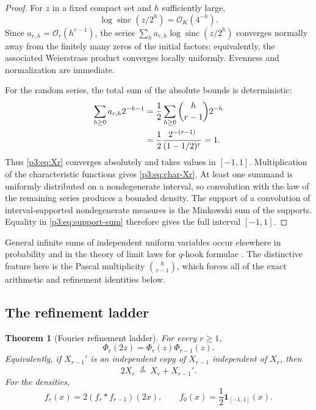 \documentclass[11pt,oneside]{article}
\newtheorem{theorem}{Theorem}[section]
\theoremstyle{definition}
\theoremstyle{remark}
\newcommand{\sinc}{\operatorname{sinc}}
\newcommand{\bigO}{\mathcal O}
\begin{document}
\begin{proof}
For $z$ in a fixed compact set and $h$ sufficiently large,
\[
 \log\sinc(z/2^h)=\bigO_K(4^{-h}).
\]
Since $a_{r,h}=\bigO_r(h^{r-1})$, the series
$\sum_h a_{r,h}\log\sinc(z/2^h)$ converges normally away from the finitely many zeros of the initial factors; equivalently, the associated Weierstrass product converges locally uniformly.  Evenness and normalization are immediate.

For the random series, the total sum of the absolute bounds is deterministic:
\begin{align}
 \sum_{h\ge0}a_{r,h}2^{-h-1}
 &=\frac12\sum_{h\ge0}\binom h{r-1}2^{-h}\notag\\
 &=\frac12\frac{2^{-(r-1)}}{(1-1/2)^r}=1.\label{p3:eq:support-sum}
\end{align}
Thus \eqref{p3:eq:Xr} converges absolutely and takes values in $[-1,1]$.  Multiplication of the characteristic functions gives \eqref{p3:eq:char-Xr}.  At least one summand is uniformly distributed on a nondegenerate interval, so convolution with the law of the remaining series produces a bounded density.  The support of a convolution of interval-supported nondegenerate measures is the Minkowski sum of the supports.  Equality in \eqref{p3:eq:support-sum} therefore gives the full interval $[-1,1]$.
\end{proof}

\begin{remark}
General infinite sums of independent uniform variables occur elsewhere in probability and in the theory of limit laws for $q$-hook formulae \cite{p3:jessen-wintner,p3:billey-swanson}.  The distinctive feature here is the Pascal multiplicity $\binom h{r-1}$, which forces all of the exact arithmetic and refinement identities below.
\end{remark}

\subsection{The refinement ladder}

\begin{theorem}[Fourier refinement ladder]\label{p3:thm:refinement}
For every $r\ge1$,
\begin{equation}\label{p3:eq:refinement-fourier}
  \Phi_r(2z)=\Phi_r(z)\Phi_{r-1}(z).
\end{equation}
Equivalently, if $X_{r-1}'$ is an independent copy of $X_{r-1}$ independent of $X_r$, then
\begin{equation}\label{p3:eq:refinement-prob}
  2X_r\ \stackrel{d}{=}\ X_r+X_{r-1}'.
\end{equation}
For the densities,
\begin{equation}\label{p3:eq:refinement-density}
  f_r(x)=2(f_r*f_{r-1})(2x),
  \qquad
  f_0(x)=\frac12\mathbf 1_{[-1,1]}(x).
\end{equation}
\end{theorem}
\end{document}
